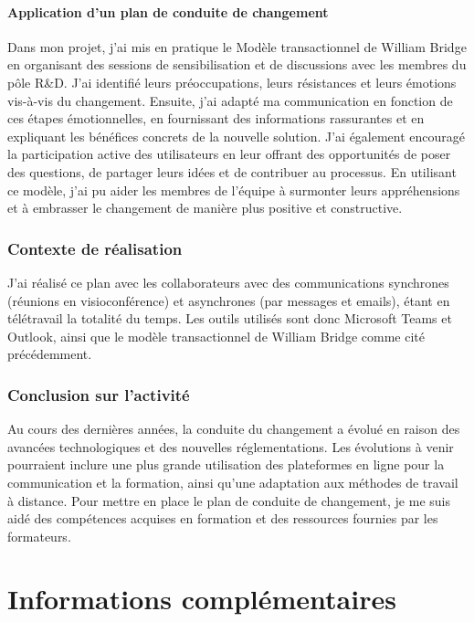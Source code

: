 \documentclass[a4paper, 11pt]{report}
\begin{document}
\subsubsection{Application d'un plan de conduite de changement}
Dans mon projet, j'ai mis en pratique le Modèle transactionnel de
William Bridge en organisant des sessions de sensibilisation et de
discussions avec les membres du pôle R\&D. J'ai identifié leurs
préoccupations, leurs résistances et leurs émotions vis-à-vis du
changement. Ensuite, j'ai adapté ma communication en fonction de ces
étapes émotionnelles, en fournissant des informations rassurantes et en
expliquant les bénéfices concrets de la nouvelle solution. J'ai
également encouragé la participation active des utilisateurs en leur
offrant des opportunités de poser des questions, de partager leurs idées
et de contribuer au processus. En utilisant ce modèle, j'ai pu aider les
membres de l'équipe à surmonter leurs appréhensions et à embrasser le
changement de manière plus positive et constructive.
\subsection{Contexte de réalisation}
J'ai réalisé ce plan avec les collaborateurs avec des communications
synchrones (réunions en visioconférence) et asynchrones (par messages et
emails), étant en télétravail la totalité du temps. Les outils utilisés
sont donc Microsoft Teams et Outlook, ainsi que le modèle transactionnel
de William Bridge comme cité précédemment.
\subsection{Conclusion sur l'activité}
Au cours des dernières années, la conduite du changement a évolué en
raison des avancées technologiques et des nouvelles réglementations. Les
évolutions à venir pourraient inclure une plus grande utilisation des
plateformes en ligne pour la communication et la formation, ainsi qu'une
adaptation aux méthodes de travail à distance.
\newline
\newline
Pour mettre en place le plan de conduite de changement, je me suis aidé
des compétences acquises en formation et des ressources fournies par les
formateurs.

\chapter{Informations complémentaires}
\end{document}
